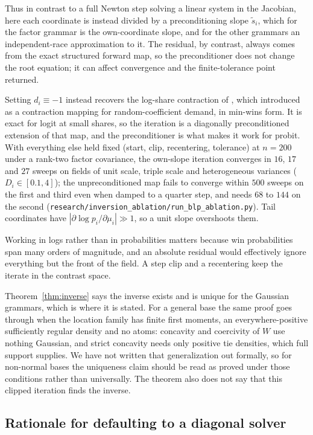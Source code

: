 \documentclass[11pt]{article}
\begin{document}
Thus in contrast to a full Newton step solving a linear system in the Jacobian, here each
coordinate is instead divided by a preconditioning slope $\tilde s_i$,
which for the factor grammar is the own-coordinate slope, and for the other grammars an independent-race
approximation to it. The residual, by contrast, always comes from the
exact structured forward map, so the preconditioner does not change the
root equation; it can affect convergence and the finite-tolerance point
returned.

Setting $d_i\equiv-1$ instead recovers the log-share contraction of
\citet{berry1994}, which \citet{berry1995} introduced as a contraction
mapping for random-coefficient demand, in min-wins form. It is exact for
logit at small shares, so
the iteration is a diagonally preconditioned extension of that map,
and the preconditioner is what makes it work for probit. With everything
else held fixed (start, clip, recentering, tolerance) at $n=200$ under a
rank-two factor covariance, the own-slope iteration converges in $16$,
$17$ and $27$ sweeps on fields of unit scale, triple scale and
heterogeneous variances ($D_i\in[0.1,4]$); the unpreconditioned map fails
to converge within $500$ sweeps on the first and third even when damped
to a quarter step, and needs $68$ to $144$ on the second
(\texttt{research/inversion\_ablation/run\_blp\_ablation.py}). Tail
coordinates have $|\partial\log p_i/\partial\mu_i|\gg1$, so a unit slope
overshoots them.

Working in logs rather than in probabilities matters because win probabilities span
many orders of magnitude, and an absolute residual would effectively
ignore everything but the front of the field. A step clip and a
recentering keep the iterate in the contrast space.

Theorem~\ref{thm:inverse} says the inverse exists and is unique for the
Gaussian grammars, which is where it is stated. For a general base the
same proof goes through when the location family has finite first
moments, an everywhere-positive sufficiently regular density and no
atoms: concavity and coercivity of $W$ use nothing Gaussian, and strict
concavity needs only positive tie densities, which full support supplies.
We have not written that generalization out formally, so for non-normal
bases the uniqueness claim should be read as proved under those
conditions rather than universally. The theorem also does not say that
this clipped iteration finds the inverse.

\subsection{Rationale for defaulting to a diagonal solver}
\end{document}
